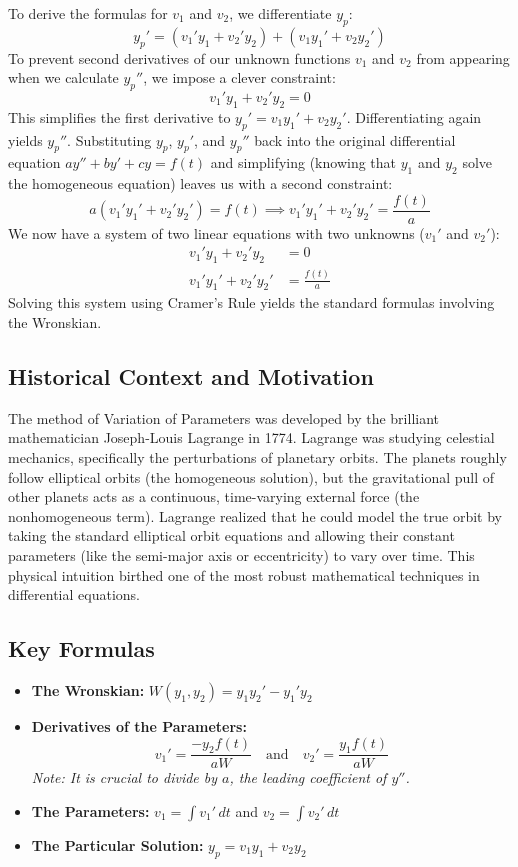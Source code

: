 \documentclass{article}
\begin{document}
To derive the formulas for $v_1$ and $v_2$, we differentiate $y_p$:
\[ y_p' = (v_1' y_1 + v_2' y_2) + (v_1 y_1' + v_2 y_2') \]
To prevent second derivatives of our unknown functions $v_1$ and $v_2$ from appearing when we calculate $y_p''$, we impose a clever constraint:
\[ v_1' y_1 + v_2' y_2 = 0 \]
This simplifies the first derivative to $y_p' = v_1 y_1' + v_2 y_2'$. Differentiating again yields $y_p''$. Substituting $y_p$, $y_p'$, and $y_p''$ back into the original differential equation $a y'' + b y' + c y = f(t)$ and simplifying (knowing that $y_1$ and $y_2$ solve the homogeneous equation) leaves us with a second constraint:
\[ a(v_1' y_1' + v_2' y_2') = f(t) \implies v_1' y_1' + v_2' y_2' = \frac{f(t)}{a} \]
We now have a system of two linear equations with two unknowns ($v_1'$ and $v_2'$):
\begin{align*}
v_1' y_1 + v_2' y_2 &= 0 \\
v_1' y_1' + v_2' y_2' &= \frac{f(t)}{a}
\end{align*}
Solving this system using Cramer's Rule yields the standard formulas involving the Wronskian.

\subsection{Historical Context and Motivation}
The method of Variation of Parameters was developed by the brilliant mathematician Joseph-Louis Lagrange in 1774. Lagrange was studying celestial mechanics, specifically the perturbations of planetary orbits. The planets roughly follow elliptical orbits (the homogeneous solution), but the gravitational pull of other planets acts as a continuous, time-varying external force (the nonhomogeneous term). Lagrange realized that he could model the true orbit by taking the standard elliptical orbit equations and allowing their constant parameters (like the semi-major axis or eccentricity) to vary over time. This physical intuition birthed one of the most robust mathematical techniques in differential equations.

\subsection{Key Formulas}
\begin{itemize}
    \item \textbf{The Wronskian:} $W(y_1, y_2) = y_1 y_2' - y_1' y_2$
    \item \textbf{Derivatives of the Parameters:} 
    \[ v_1' = \frac{-y_2 f(t)}{a W} \quad \text{and} \quad v_2' = \frac{y_1 f(t)}{a W} \]
    \textit{Note: It is crucial to divide by $a$, the leading coefficient of $y''$.}
    \item \textbf{The Parameters:} $v_1 = \int v_1' \, dt$ and $v_2 = \int v_2' \, dt$
    \item \textbf{The Particular Solution:} $y_p = v_1 y_1 + v_2 y_2$
\end{itemize}
\end{document}
